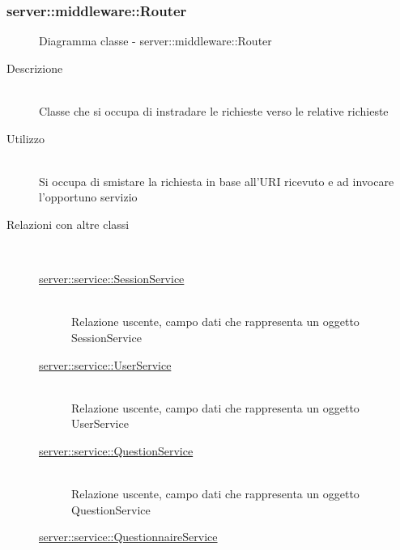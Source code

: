 \subsubsection[Router]{server::middleware::Router}
\begin{figure}[H]
	\centering
	\caption{Diagramma classe - server::middleware::Router}
\end{figure}\begin{description}
\item[Descrizione] \hfill \\
Classe che si occupa di instradare le richieste verso le relative richieste
\item[Utilizzo] \hfill \\
Si occupa di smistare la richiesta in base all’URI ricevuto e ad invocare l’opportuno servizio
\item[Relazioni con altre classi] \hfill \\
\vspace{-7mm}
\begin{description}
	\item[\hyperlink{server::service::SessionService}{server::service::SessionService}] \hfill \\
	Relazione uscente, campo dati che rappresenta un oggetto SessionService
	\item[\hyperlink{server::service::UserService}{server::service::UserService}] \hfill \\
	Relazione uscente, campo dati che rappresenta un oggetto UserService
	\item[\hyperlink{server::service::QuestionService}{server::service::QuestionService}] \hfill \\
	Relazione uscente, campo dati che rappresenta un oggetto QuestionService
	\item[\hyperlink{server::service::QuestionnaireService}{server::service::QuestionnaireService}] \hfill \\

\end{description}
\end{description}
